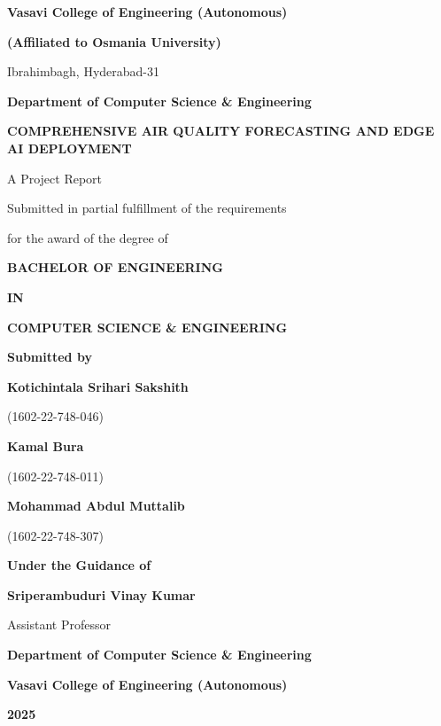 \documentclass[12pt,a4paper]{report}
\newcommand{\projecttitle}{COMPREHENSIVE AIR QUALITY FORECASTING AND EDGE AI DEPLOYMENT}
\newcommand{\studentA}{Kotichintala Srihari Sakshith}
\newcommand{\htnoA}{1602-22-748-046}
\newcommand{\studentB}{Kamal Bura}
\newcommand{\htnoB}{1602-22-748-011}
\newcommand{\studentC}{Mohammad Abdul Muttalib}
\newcommand{\htnoC}{1602-22-748-307}
\newcommand{\guide}{Sriperambuduri Vinay Kumar}
\newcommand{\designation}{Assistant Professor}
\newcommand{\dept}{Department of Computer Science \& Engineering}
\newcommand{\college}{Vasavi College of Engineering (Autonomous)}
\newcommand{\affiliation}{(Affiliated to Osmania University)}
\newcommand{\location}{Ibrahimbagh, Hyderabad-31}
\newcommand{\theyear}{2025}
\begin{document}
\begin{titlepage}
\singlespacing
    \centering
    \vspace*{0.2in}
    {\Large \textbf{\college} \par}
    \vspace{0.1in}
    {\large \textbf{\affiliation} \par}
    \vspace{0.1in}
    {\large \location \par}
    \vspace{0.4in}
    {\Large \textbf{\dept} \par}
    \vspace{0.4in}
    {\LARGE \textbf{\projecttitle} \par}
    \vspace{0.3in}
    {\large A Project Report \par}
    {\large Submitted in partial fulfillment of the requirements \par}
    {\large for the award of the degree of \par}
    \vspace{0.2in}
    {\LARGE \textbf{BACHELOR OF ENGINEERING} \par}
    {\large \textbf{IN} \par}
    {\LARGE \textbf{COMPUTER SCIENCE \& ENGINEERING} \par}
    \vspace{0.4in}
    {\large \textbf{Submitted by} \par}
    \vspace{0.2in}
    {\large \textbf{\studentA} \par}
    {\large (\htnoA) \par}
    \vspace{0.1in}
    {\large \textbf{\studentB} \par}
    {\large (\htnoB) \par}
    \vspace{0.1in}
    {\large \textbf{\studentC} \par}
    {\large (\htnoC) \par}
    \vspace{0.4in}
    {\large \textbf{Under the Guidance of} \par}
    \vspace{0.1in}
    {\large \textbf{\guide} \par}
    {\large \designation \par}
    \vfill
    {\large \textbf{\dept} \par}
    {\large \textbf{\college} \par}
    {\large \textbf{\theyear} \par}
\end{titlepage}
\end{document}
